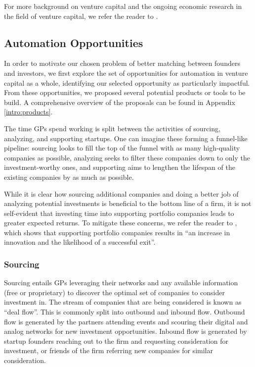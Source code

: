 For more background on venture capital and the ongoing economic research in the field of venture capital, we refer the reader to \cite{venture-survey}.

\subsection{Automation Opportunities}

In order to motivate our chosen problem of better matching between founders and investors, we first explore the set of opportunities for automation in venture capital as a whole, identifying our selected opportunity as particularly impactful. From these opportunities, we proposed several potential products or tools to be build. A comprehensive overview of the proposals can be found in Appendix \ref{intro:products}.

The time GPs spend working is split between the activities of sourcing, analyzing, and supporting startups. One can imagine these forming a funnel-like pipeline: sourcing looks to fill the top of the funnel with as many high-quality companies as possible, analyzing seeks to filter these companies down to only the investment-worthy ones, and supporting aims to lengthen the lifespan of the existing companies by as much as possible.

While it is clear how sourcing additional companies and doing a better job of analyzing potential investments is beneficial to the bottom line of a firm, it is not self-evident that investing time into supporting portfolio companies leads to greater expected returns. To mitigate these concerns, we refer the reader to \cite{JOFI:JOFI12370}, which shows that supporting portfolio companies results in ``an increase in innovation and the likelihood of a successful exit''.

\subsubsection{Sourcing}

Sourcing entails GPs leveraging their networks and any available information (free or proprietary) to discover the optimal set of companies to consider investment in. The stream of companies that are being considered is known as ``deal flow''. This is commonly split into outbound and inbound flow. Outbound flow is generated by the partners attending events and scouring their digital and analog networks for new investment opportunities. Inbound flow is generated by startup founders reaching out to the firm and requesting consideration for investment, or friends of the firm referring new companies for similar consideration.


